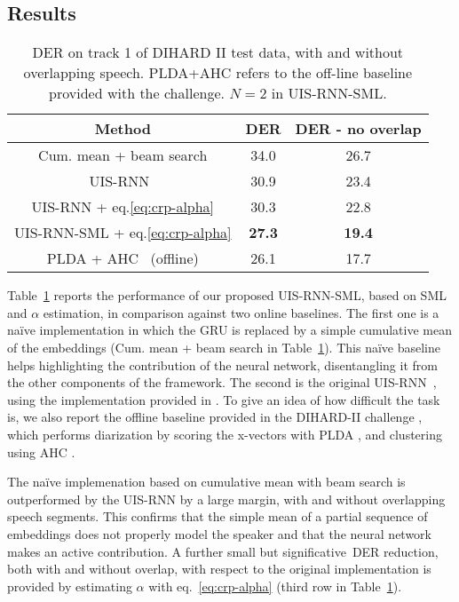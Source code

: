 \documentclass{article}
\begin{document}
\subsection{Results}
\label{sec:results}
\begin{table}[!ht]
\begin{center}
    \begin{tabular}{ |c|c|c| } 
        \hline
        \textbf{Method} & \textbf{DER} & \textbf{DER - no overlap}\\ 
        \hline
        \hline
        Cum. mean + beam search  & 34.0 & 26.7\\
        UIS-RNN~\cite{zhang2019fully}\cite{uisrnn-official-library} & 30.9 & 23.4\\
        UIS-RNN + eq.\ref{eq:crp-alpha} & 30.3 & 22.8\\ 
        UIS-RNN-SML + eq.\ref{eq:crp-alpha} & \textbf{27.3} & \textbf{19.4}\\
        \hline
        \hline
        PLDA + AHC~\cite{Ryant2019} (offline) & 26.1 & 17.7\\
        \hline
    \end{tabular}
\end{center}
\caption{\ac{DER} on track 1 of DIHARD II test data, with and without overlapping speech. \ac{PLDA}+\ac{AHC} refers to the off-line baseline provided with the challenge. $N=2$ in UIS-RNN-SML.}
\label{tab:DER}
\end{table}

Table~\ref{tab:DER} reports the performance of our proposed UIS-RNN-SML, based on SML and $\alpha$ estimation, in comparison against two online baselines. The first one is a na\"ive implementation in which the GRU is replaced by a simple cumulative mean of the embeddings (Cum. mean + beam search in Table~\ref{tab:DER}). This na\"ive baseline helps highlighting the contribution of the neural network, disentangling it from the other components of the framework. The second is the original UIS-RNN~\cite{zhang2019fully}, using the implementation provided in \cite{uisrnn-official-library}. 
To give an idea of how difficult the task is, we also report the offline baseline provided in the DIHARD-II challenge \cite{Ryant2019}, which performs diarization by scoring the x-vectors with \ac{PLDA} \cite{sell2014speaker}, and clustering using \ac{AHC} \cite{han2008strategies}.

The na\"ive implemenation based on cumulative mean with beam search is outperformed by the UIS-RNN by a large margin, with and without overlapping speech segments. This confirms that the simple mean of a partial sequence of embeddings does not properly model the speaker and that the neural network makes an active contribution. A further small but significative~\ac{DER} reduction, both with and without overlap, with respect to the original implementation is provided by estimating $\alpha$ with eq.~\ref{eq:crp-alpha} (third row in Table~\ref{tab:DER}). 
\end{document}
